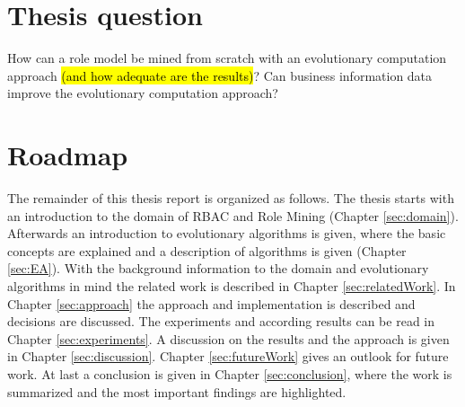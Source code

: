 \section{Thesis question}
How can a role model be mined from scratch with an evolutionary computation approach \hl{(and how adequate are the results)}? Can business information data improve the evolutionary computation approach?

\section{Roadmap}
The remainder of this thesis report is organized as follows. The thesis starts with an introduction to the domain of RBAC and Role Mining (Chapter \ref{sec:domain}). Afterwards an introduction to evolutionary algorithms is given, where the basic concepts are explained and a description of algorithms is given (Chapter \ref{sec:EA}). With the background information to the domain and evolutionary algorithms in mind the related work is described in Chapter \ref{sec:relatedWork}. In Chapter \ref{sec:approach} the approach and implementation is described and decisions are discussed. The experiments and according results can be read in Chapter \ref{sec:experiments}. A discussion on the results and the approach is given in Chapter \ref{sec:discussion}. Chapter \ref{sec:futureWork} gives an outlook for future work. At last a conclusion is given in Chapter \ref{sec:conclusion}, where the work is summarized and the most important findings are highlighted.